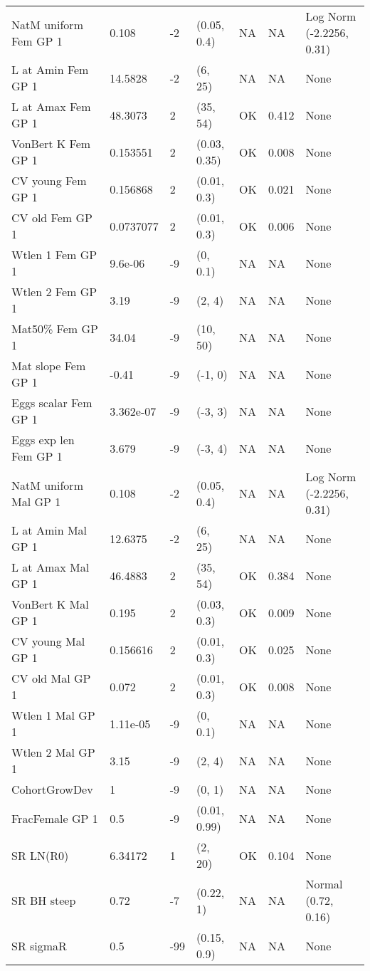 \documentclass[11pt,
  english,
  letterpaper,
]{article}
\begin{document}
\begin{landscape}
\begin{longtable}[t]{>{\raggedright\arraybackslash}p{7.5cm}lllll>{\raggedright\arraybackslash}p{3.5cm}}
\endfoot
\bottomrule
\endlastfoot
NatM uniform Fem GP 1 & 0.108 & -2 & (0.05, 0.4) & NA & NA & Log Norm (-2.2256, 0.31)\\
L at Amin Fem GP 1 & 14.5828 & -2 & (6, 25) & NA & NA & None\\
L at Amax Fem GP 1 & 48.3073 & 2 & (35, 54) & OK & 0.412 & None\\
VonBert K Fem GP 1 & 0.153551 & 2 & (0.03, 0.35) & OK & 0.008 & None\\
CV young Fem GP 1 & 0.156868 & 2 & (0.01, 0.3) & OK & 0.021 & None\\
CV old Fem GP 1 & 0.0737077 & 2 & (0.01, 0.3) & OK & 0.006 & None\\
Wtlen 1 Fem GP 1 & 9.6e-06 & -9 & (0, 0.1) & NA & NA & None\\
Wtlen 2 Fem GP 1 & 3.19 & -9 & (2, 4) & NA & NA & None\\
Mat50\% Fem GP 1 & 34.04 & -9 & (10, 50) & NA & NA & None\\
Mat slope Fem GP 1 & -0.41 & -9 & (-1, 0) & NA & NA & None\\
Eggs scalar Fem GP 1 & 3.362e-07 & -9 & (-3, 3) & NA & NA & None\\
Eggs exp len Fem GP 1 & 3.679 & -9 & (-3, 4) & NA & NA & None\\
NatM uniform Mal GP 1 & 0.108 & -2 & (0.05, 0.4) & NA & NA & Log Norm (-2.2256, 0.31)\\
L at Amin Mal GP 1 & 12.6375 & -2 & (6, 25) & NA & NA & None\\
L at Amax Mal GP 1 & 46.4883 & 2 & (35, 54) & OK & 0.384 & None\\
VonBert K Mal GP 1 & 0.195 & 2 & (0.03, 0.3) & OK & 0.009 & None\\
CV young Mal GP 1 & 0.156616 & 2 & (0.01, 0.3) & OK & 0.025 & None\\
CV old Mal GP 1 & 0.072 & 2 & (0.01, 0.3) & OK & 0.008 & None\\
Wtlen 1 Mal GP 1 & 1.11e-05 & -9 & (0, 0.1) & NA & NA & None\\
Wtlen 2 Mal GP 1 & 3.15 & -9 & (2, 4) & NA & NA & None\\
CohortGrowDev & 1 & -9 & (0, 1) & NA & NA & None\\
FracFemale GP 1 & 0.5 & -9 & (0.01, 0.99) & NA & NA & None\\
SR LN(R0) & 6.34172 & 1 & (2, 20) & OK & 0.104 & None\\
SR BH steep & 0.72 & -7 & (0.22, 1) & NA & NA & Normal (0.72, 0.16)\\
SR sigmaR & 0.5 & -99 & (0.15, 0.9) & NA & NA & None\\

\end{longtable}
\end{landscape}
\end{document}
